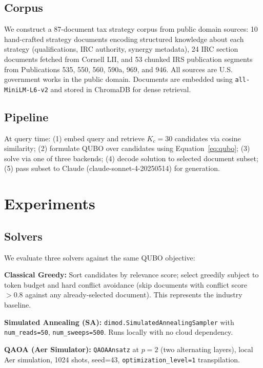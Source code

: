 \documentclass{article}
\begin{document}
\subsection{Corpus}

We construct a 87-document tax strategy corpus from public domain
sources: 10 hand-crafted strategy documents encoding structured
knowledge about each strategy (qualifications, IRC authority, synergy
metadata), 24 IRC section documents fetched from Cornell LII, and 53
chunked IRS publication segments from Publications 535, 550, 560, 590a,
969, and 946. All sources are U.S. government works in the public
domain. Documents are embedded using \texttt{all-MiniLM-L6-v2}
\cite{reimers2019sbert} and stored in ChromaDB for dense retrieval.

\subsection{Pipeline}

At query time: (1) embed query and retrieve $K_c = 30$ candidates via
cosine similarity; (2) formulate QUBO over candidates using
Equation~\ref{eq:qubo}; (3) solve via one of three backends; (4) decode
solution to selected document subset; (5) pass subset to Claude
(claude-sonnet-4-20250514) for generation.

\section{Experiments}
\label{sec:experiments}

\subsection{Solvers}

We evaluate three solvers against the same QUBO objective:

\textbf{Classical Greedy:} Sort candidates by relevance score; select
greedily subject to token budget and hard conflict avoidance (skip
documents with conflict score $> 0.8$ against any already-selected
document). This represents the industry baseline.

\textbf{Simulated Annealing (SA):} \texttt{dimod.SimulatedAnnealingSampler}
with \texttt{num\_reads=50}, \texttt{num\_sweeps=500}. Runs locally with
no cloud dependency.

\textbf{QAOA (Aer Simulator):} \texttt{QAOAAnsatz} at $p=2$ (two
alternating layers), local Aer simulation, 1024 shots, seed=43,
\texttt{optimization\_level=1} transpilation.
\end{document}
